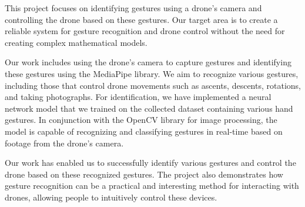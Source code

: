 This project focuses on identifying gestures using a drone's camera and controlling the drone based on these gestures. Our target area is to create a reliable system for gesture recognition and drone control without the need for creating complex mathematical models.

Our work includes using the drone's camera to capture gestures and identifying these gestures using the MediaPipe library. We aim to recognize various gestures, including those that control drone movements such as ascents, descents, rotations, and taking photographs. For identification, we have implemented a neural network model that we trained on the collected dataset containing various hand gestures. In conjunction with the OpenCV library for image processing, the model is capable of recognizing and classifying gestures in real-time based on footage from the drone's camera.

Our work has enabled us to successfully identify various gestures and control the drone based on these recognized gestures. The project also demonstrates how gesture recognition can be a practical and interesting method for interacting with drones, allowing people to intuitively control these devices.